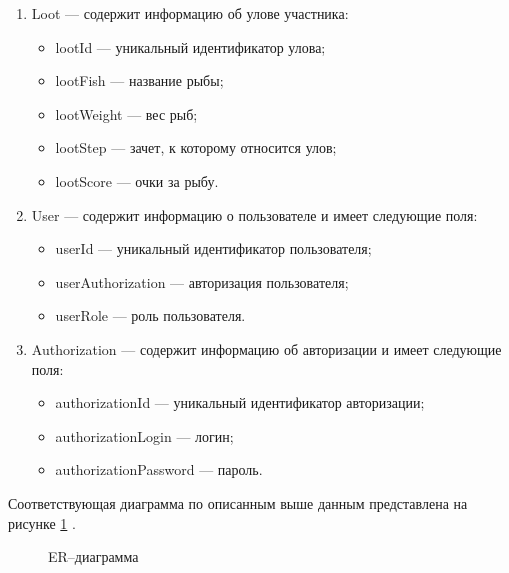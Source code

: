 \begin{enumerate}
	\item Loot --- содержит информацию об улове участника:
	\begin{itemize}[label=---]
		\item lootId --- уникальный идентификатор улова;
		\item lootFish --- название рыбы;
		\item lootWeight --- вес рыб;
		\item lootStep --- зачет, к которому относится улов;
		\item lootScore --- очки за рыбу.
	\end{itemize}
	
	\item User --- содержит информацию о пользователе и имеет следующие поля:
	\begin{itemize}[label=---]
		\item userId --- уникальный идентификатор пользователя;
		\item userAuthorization --- авторизация пользователя;
		\item userRole ---  роль пользователя.
	\end{itemize}	
	
	\item Authorization --- содержит информацию об авторизации и имеет следующие поля:
	\begin{itemize}[label=---]
		\item authorizationId --- уникальный идентификатор авторизации;
		\item authorizationLogin --- логин;
		\item authorizationPassword ---  пароль.
	\end{itemize}	
\end{enumerate}

Соответствующая диаграмма по описанным выше данным представлена на рисунке \ref{fig:er} .

\begin{figure}[ht!]
	\caption{ER--диаграмма}
	\label{fig:er}
\end{figure}

